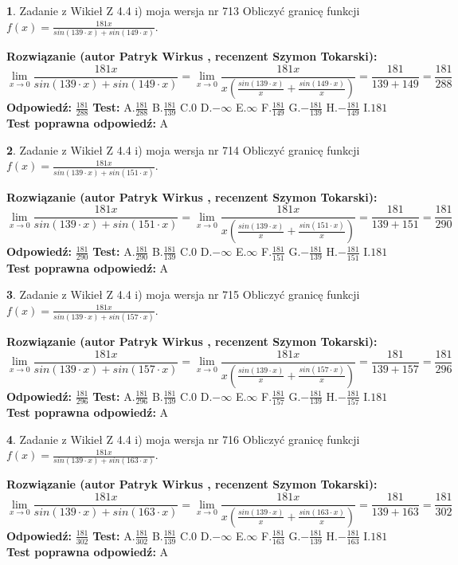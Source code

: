 \documentclass[12pt, a4paper]{article}
\theoremstyle{definition} %
\newtheorem{zad}{}
\newcommand{\zadStart}[1]{\begin{zad}#1\newline}
\newcommand{\zadStop}{\end{zad}}
\newcommand{\rozwStart}[2]{\noindent \textbf{Rozwiązanie (autor #1 , recenzent #2): }\newline}
\newcommand{\rozwStop}{\newline}
\newcommand{\odpStart}{\noindent \textbf{Odpowiedź:}\newline}
\newcommand{\odpStop}{\newline}
\newcommand{\testStart}{\noindent \textbf{Test:}\newline}
\newcommand{\testStop}{\newline}
\newcommand{\kluczStart}{\noindent \textbf{Test poprawna odpowiedź:}\newline}
\newcommand{\kluczStop}{\newline}
\begin{document}
\zadStart{Zadanie z Wikieł Z 4.4 i) moja wersja nr 713}
Obliczyć granicę funkcji $f(x)=\frac{181x}{sin(139\cdot x) +sin(149\cdot x)}$.
\zadStop
\rozwStart{Patryk Wirkus}{Szymon Tokarski}
$$\lim\limits_{x\to 0}\frac{181x}{sin(139\cdot x) +sin(149\cdot x)}=\lim\limits_{x\to 0}\frac{181x}{x(\frac{sin(139\cdot x)}{x}+\frac{sin(149\cdot x)}{x})}=\frac{181}{139+149} = \frac{181}{288}$$
\rozwStop
\odpStart
$\frac{181}{288}$
\odpStop
\testStart
A.$\frac{181}{288}$
B.$\frac{181}{139}$
C.$0$
D.$-\infty$
E.$\infty$
F.$\frac{181}{149}$
G.$-\frac{181}{139}$
H.$-\frac{181}{149}$
I.$181$
\testStop
\kluczStart
A
\kluczStop



\zadStart{Zadanie z Wikieł Z 4.4 i) moja wersja nr 714}
Obliczyć granicę funkcji $f(x)=\frac{181x}{sin(139\cdot x) +sin(151\cdot x)}$.
\zadStop
\rozwStart{Patryk Wirkus}{Szymon Tokarski}
$$\lim\limits_{x\to 0}\frac{181x}{sin(139\cdot x) +sin(151\cdot x)}=\lim\limits_{x\to 0}\frac{181x}{x(\frac{sin(139\cdot x)}{x}+\frac{sin(151\cdot x)}{x})}=\frac{181}{139+151} = \frac{181}{290}$$
\rozwStop
\odpStart
$\frac{181}{290}$
\odpStop
\testStart
A.$\frac{181}{290}$
B.$\frac{181}{139}$
C.$0$
D.$-\infty$
E.$\infty$
F.$\frac{181}{151}$
G.$-\frac{181}{139}$
H.$-\frac{181}{151}$
I.$181$
\testStop
\kluczStart
A
\kluczStop



\zadStart{Zadanie z Wikieł Z 4.4 i) moja wersja nr 715}
Obliczyć granicę funkcji $f(x)=\frac{181x}{sin(139\cdot x) +sin(157\cdot x)}$.
\zadStop
\rozwStart{Patryk Wirkus}{Szymon Tokarski}
$$\lim\limits_{x\to 0}\frac{181x}{sin(139\cdot x) +sin(157\cdot x)}=\lim\limits_{x\to 0}\frac{181x}{x(\frac{sin(139\cdot x)}{x}+\frac{sin(157\cdot x)}{x})}=\frac{181}{139+157} = \frac{181}{296}$$
\rozwStop
\odpStart
$\frac{181}{296}$
\odpStop
\testStart
A.$\frac{181}{296}$
B.$\frac{181}{139}$
C.$0$
D.$-\infty$
E.$\infty$
F.$\frac{181}{157}$
G.$-\frac{181}{139}$
H.$-\frac{181}{157}$
I.$181$
\testStop
\kluczStart
A
\kluczStop



\zadStart{Zadanie z Wikieł Z 4.4 i) moja wersja nr 716}
Obliczyć granicę funkcji $f(x)=\frac{181x}{sin(139\cdot x) +sin(163\cdot x)}$.
\zadStop
\rozwStart{Patryk Wirkus}{Szymon Tokarski}
$$\lim\limits_{x\to 0}\frac{181x}{sin(139\cdot x) +sin(163\cdot x)}=\lim\limits_{x\to 0}\frac{181x}{x(\frac{sin(139\cdot x)}{x}+\frac{sin(163\cdot x)}{x})}=\frac{181}{139+163} = \frac{181}{302}$$
\rozwStop
\odpStart
$\frac{181}{302}$
\odpStop
\testStart
A.$\frac{181}{302}$
B.$\frac{181}{139}$
C.$0$
D.$-\infty$
E.$\infty$
F.$\frac{181}{163}$
G.$-\frac{181}{139}$
H.$-\frac{181}{163}$
I.$181$
\testStop
\kluczStart
A
\kluczStop
\end{document}
